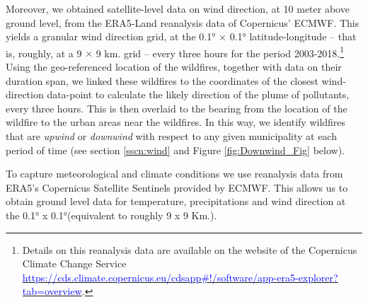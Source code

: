 \documentclass[11pt]{article}
\begin{document}
\begin{spacing}{1.3}

Moreover, we obtained satellite-level data on wind direction, at 10 meter above ground level, from the ERA5-Land reanalysis data of Copernicus' ECMWF. This yields a granular wind direction grid, at the 0.1° $\times$ 0.1° latitude-longitude -- that is, roughly, at a 9 $\times$ 9 km. grid -- every three hours for the period 2003-2018.\footnote{Details on this reanalysis data are available on the website of the Copernicus Climate Change Service \hyperlink{https://cds.climate.copernicus.eu/cdsapp\#!/software/app-era5-explorer?tab=overview}{\textcolor{blue}{https://cds.climate.copernicus.eu/cdsapp\#!/software/app-era5-explorer?tab=overview}}.} Using the geo-referenced location of the wildfires, together with data on their duration span, we linked these wildfires to the coordinates of the closest wind-direction data-point to calculate the likely direction of the plume of pollutants, every three hours. This is then overlaid to the bearing from the location of the wildfire to the urban areas near the wildfires. In this way, we identify wildfires that are \textit{upwind} or \textit{downwind} with respect to any given municipality at each period of time (see section \ref{sscn:wind} and Figure \ref{fig:Downwind_Fig} below). 


To capture meteorological and climate conditions we use reanalysis data from ERA5's Copernicus Satellite Sentinels provided by ECMWF. This allows us to obtain ground level data for temperature, precipitations and wind direction at the 0.1° x 0.1°(equivalent to roughly 9 x 9 Km.). %




\end{spacing}
\end{document}
